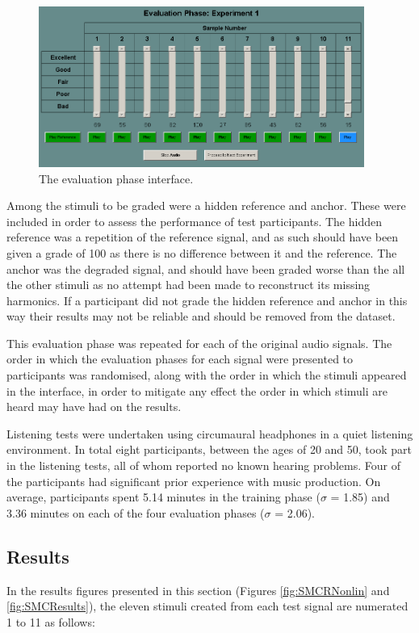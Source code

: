 			\begin{figure}[h!]
				\centering
				\includegraphics[width=0.95\textwidth]{chapter7/Images/MushraEvaluation.png}
				\caption{The evaluation phase interface.}
				\label{fig:MushraEvaluation}
			\end{figure}

			Among the stimuli to be graded were a hidden reference and anchor. These were included in order to
			assess the performance of test participants. The hidden reference was a repetition of the reference
			signal, and as such should have been given a grade of 100 as there is no difference between it and
			the reference. The anchor was the degraded signal, and should have been graded worse than the all
			the other stimuli as no attempt had been made to reconstruct its missing harmonics. If a
			participant did not grade the hidden reference and anchor in this way their results may not be
			reliable and should be removed from the dataset.

			This evaluation phase was repeated for each of the original audio signals. The order in which the
			evaluation phases for each signal were presented to participants was randomised, along with the
			order in which the stimuli appeared in the interface, in order to mitigate any effect the order in
			which stimuli are heard may have had on the results.

			Listening tests were undertaken using circumaural headphones in a quiet listening environment. In
			total eight participants, between the ages of 20 and 50, took part in the listening tests, all of
			whom reported no known hearing problems. Four of the participants had significant prior experience
			with music production. On average, participants spent 5.14 minutes in the training phase ($\sigma$
			= 1.85) and 3.36 minutes on each of the four evaluation phases ($\sigma$ = 2.06).

	\subsection{Results}
	\label{sec:PerceptualExperiments-Reconstruction-Results}
		In the results figures presented in this section (Figures \ref{fig:SMCRNonlin} and \ref{fig:SMCResults}),
		the eleven stimuli created from each test signal are numerated 1 to 11 as follows:

